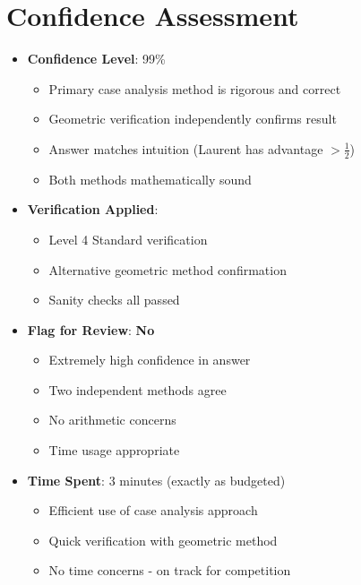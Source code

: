 \documentclass[]{article}
\begin{document}
\section*{Confidence Assessment}
\begin{itemize}[leftmargin=*]
    \item \textbf{Confidence Level}: 99\%
    \begin{itemize}
        \item Primary case analysis method is rigorous and correct
        \item Geometric verification independently confirms result
        \item Answer matches intuition (Laurent has advantage $> \frac{1}{2}$)
        \item Both methods mathematically sound
    \end{itemize}
    
    \item \textbf{Verification Applied}: 
    \begin{itemize}
        \item Level 4 Standard verification
        \item Alternative geometric method confirmation
        \item Sanity checks all passed
    \end{itemize}
    
    \item \textbf{Flag for Review}: \textbf{No}
    \begin{itemize}
        \item Extremely high confidence in answer
        \item Two independent methods agree
        \item No arithmetic concerns
        \item Time usage appropriate
    \end{itemize}
    
    \item \textbf{Time Spent}: 3 minutes (exactly as budgeted)
    \begin{itemize}
        \item Efficient use of case analysis approach
        \item Quick verification with geometric method
        \item No time concerns - on track for competition
    \end{itemize}
\end{itemize}
\end{document}

